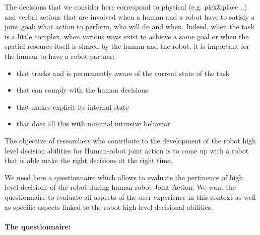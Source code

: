 \documentclass[english,a4paper,11pt,twoside]{StyleThese}
\begin{document}
The decisions that we consider here correspond to physical (e.g. pick$\&$place ..) and verbal actions that are involved when a human and a robot have to satisfy a joint goal: what action to perform, who will do and when.
Indeed, when the task is a little complex, when various ways exist to achieve a same goal or when the spatial resource itself is shared by the human and the robot, it is important for the human to have a robot partner:
\begin{itemize}
\item that tracks and is permanently aware of the current state of the task
\item that can comply with the human decisions
\item that makes explicit its internal state
\item that does all this with minimal intrusive behavior
\end{itemize}
The objective of researchers who contribute to the development of the robot high level decision abilities for Human-robot joint action is to come up with a robot that is able make the right decisions at the right time. 

We need here a questionnaire which allows to evaluate the pertinence of high level decisions of the robot during human-robot Joint Action. We want the questionnaire to evaluate all aspects of the user experience in this context as well as specific aspects linked to the robot high level decisional abilities. 

\paragraph{The questionnaire:}
\end{document}
